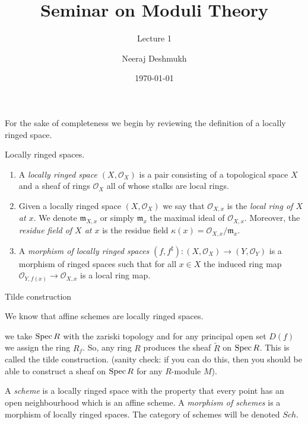 \documentclass[ignorenonframetext,t]{beamer}
\title{Seminar on Moduli Theory}
\subtitle{Lecture 1}
\author{Neeraj Deshmukh}
\date{\today}
\newcommand{\Spec}{{\rm Spec \,}}
\renewcommand{\tilde}{\widetilde}
\theoremstyle{definition}
\begin{document}
	
	
\begin{frame}
\titlepage
\end{frame}

\begin{frame}
For the sake of completeness we begin by reviewing the definition of a locally ringed space.

\begin{definition}
	\label{definition-locally-ringed-space}
	Locally ringed spaces.
	\begin{enumerate}
		\item A {\it locally ringed space $(X, \mathcal{O}_X)$}
		is a pair consisting of a
		topological space $X$ and a sheaf of rings $\mathcal{O}_X$ all of whose stalks
		are local rings.
		\item Given a locally ringed space $(X, \mathcal{O}_X)$ we say that
		$\mathcal{O}_{X, x}$ is the {\it local ring of $X$ at $x$}.
		We denote $\mathfrak{m}_{X, x}$ or simply $\mathfrak{m}_x$
		the maximal ideal of $\mathcal{O}_{X, x}$. Moreover, the
		{\it residue field of $X$ at $x$} is the residue field
		$\kappa(x) = \mathcal{O}_{X, x}/\mathfrak{m}_x$.
		\item A {\it morphism of locally ringed spaces}
		$(f, f^\sharp) : (X, \mathcal{O}_X) \to (Y, \mathcal{O}_Y)$
		is a morphism of ringed spaces such that for all $x \in X$
		the induced ring map $\mathcal{O}_{Y, f(x)} \to \mathcal{O}_{X, x}$ is a
		local ring map.
	\end{enumerate}
\end{definition}
\end{frame}

\begin{frame}{Tilde construction}

We know that affine schemes are locally ringed spaces.
\end{frame}
we take $\Spec R$ with the zariski topology and for any principal open set $D(f)$ we assign the ring $R_f$. So, any ring $R$ produces the sheaf $\tilde{R}$ on $\Spec R$. This is called the tilde construction. (sanity check: if you can do this, then you should be able to construct a sheaf on $\Spec R$ for any $R$-module $M$).

\begin{frame}
\begin{definition}
	A {\it scheme} is a locally ringed space with the property that
	every point has an open neighbourhood which is an affine scheme.
	A {\it morphism of schemes} is a morphism of locally
	ringed spaces. The category of schemes will be denoted
	$Sch$.
\end{definition}

\end{frame}
\end{document}
